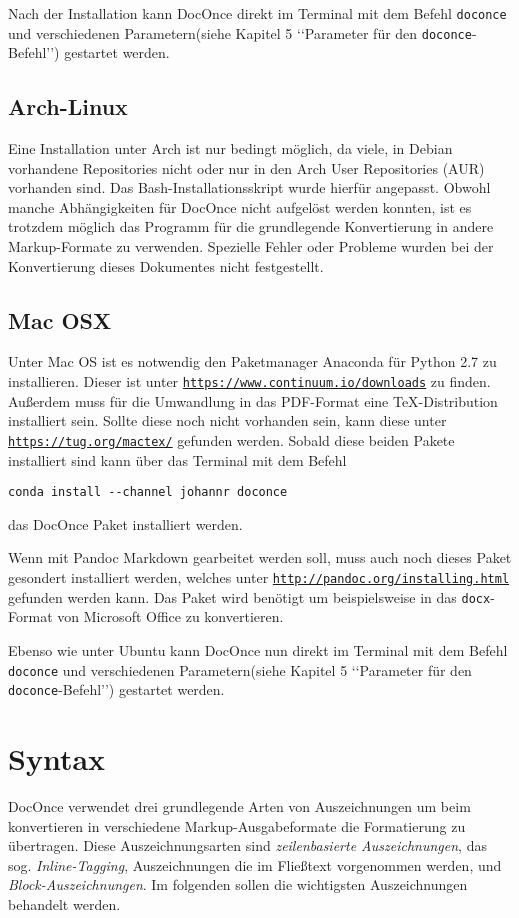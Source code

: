 \documentclass[%
oneside,                 %
final,                   %
chapterprefix=true,      %
open=right,              %
10pt]{book}
\begin{document}
Nach der Installation kann DocOnce direkt im Terminal mit dem Befehl \texttt{doconce} und verschiedenen Parametern(siehe Kapitel 5 ‘‘Parameter für den \texttt{doconce}-Befehl’’) gestartet werden.

\section{Arch-Linux}
Eine Installation unter Arch ist nur bedingt möglich, da viele, in Debian vorhandene Repositories nicht oder nur in den Arch User Repositories (AUR) vorhanden sind. Das Bash-Installationsskript wurde hierfür angepasst. Obwohl manche Abhängigkeiten für DocOnce nicht aufgelöst werden konnten, ist es trotzdem möglich das Programm für die grundlegende Konvertierung in andere Markup-Formate zu verwenden. Spezielle Fehler oder Probleme wurden bei der Konvertierung dieses Dokumentes nicht festgestellt.

\section{Mac OSX}
Unter Mac OS ist es notwendig den Paketmanager Anaconda für Python 2.7 zu installieren. Dieser ist unter \href{{https://www.continuum.io/downloads}}{\nolinkurl{https://www.continuum.io/downloads}} zu finden. Außerdem muss für die Umwandlung in das PDF-Format eine TeX-Distribution installiert sein. Sollte diese noch nicht vorhanden sein, kann diese unter \href{{https://tug.org/mactex/}}{\nolinkurl{https://tug.org/mactex/}} gefunden werden.
Sobald diese beiden Pakete installiert sind kann über das Terminal mit dem Befehl
\begin{verbatim}
conda install --channel johannr doconce
\end{verbatim}
das DocOnce Paket installiert werden.

Wenn mit Pandoc Markdown gearbeitet werden soll, muss auch noch dieses Paket gesondert installiert werden, welches unter \href{{http://pandoc.org/installing.html}}{\nolinkurl{http://pandoc.org/installing.html}} gefunden werden kann. Das Paket wird benötigt um beispielsweise in das \texttt{docx}-Format von Microsoft Office zu konvertieren.

Ebenso wie unter Ubuntu kann DocOnce nun direkt im Terminal mit dem Befehl \texttt{doconce} und verschiedenen Parametern(siehe Kapitel 5 ‘‘Parameter für den \texttt{doconce}-Befehl’’) gestartet werden.
\chapter{Syntax}
DocOnce verwendet drei grundlegende Arten von Auszeichnungen um beim konvertieren in verschiedene Markup-Ausgabeformate die Formatierung zu übertragen. Diese Auszeichnungsarten sind  \emph{zeilenbasierte Auszeichnungen}, das sog. \emph{Inline-Tagging}, Auszeichnungen die im Fließtext vorgenommen werden, und \emph{Block-Auszeichnungen}. Im folgenden sollen die wichtigsten Auszeichnungen behandelt werden.
\end{document}
